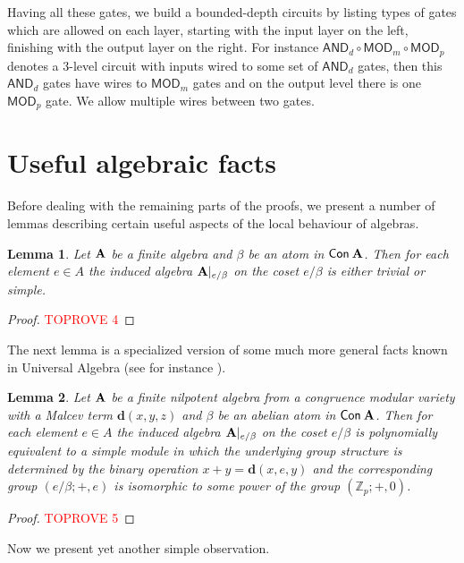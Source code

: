 \documentclass[11pt,a4paper]{amsart}
\newtheorem{lm}{Lemma}[section]
\newcommand{\m}[1]{{\uppercase {\bf{#1}}}}
\newcommand{\con}[1]{{\sf Con\:\m{#1}}}
\newcommand{\po}[1]{{\mathbf {#1}}}
\newcounter{note}
\newcommand{\z}{\mathbb{Z}}
\newcommand{\zero}{e}
\newcommand{\ccand}{\mathsf{AND}}
\newcommand{\ccmod}{\mathsf{MOD}}
\begin{document}
Having all these gates, we build a bounded-depth circuits by listing types of gates which are allowed on each layer, starting with the input layer on the left, finishing with the output layer on the right. For instance $\ccand_d\circ\ccmod_m\circ\ccmod_p$ denotes a $3$-level circuit with inputs wired to some set of $\ccand_d$ gates, then this  $\ccand_d$ gates have wires to $\ccmod_m$ gates and on the output level there is one $\ccmod_p$ gate. We allow multiple wires between two gates.

\section{Useful algebraic facts}
\label{section:collection}

Before dealing with the remaining parts of the proofs, we present a number of lemmas describing certain useful aspects of the local behaviour of algebras. 


\begin{lm}
\label{lm:simple-atom}
Let $\m A$ be a finite algebra and $\beta$ be an atom in $\con A$.
Then for each element $\zero\in A$ the induced algebra $\m A|_{\zero/\beta}$
on the coset $\zero/\beta$
is either trivial or simple.
\end{lm}
\begin{proof}\textcolor{red}{TOPROVE 4}\end{proof}


The next lemma is a specialized version of some much more general facts known in Universal Algebra (see for instance \cite[Corollary 5.8]{fm}).


\begin{lm}
\label{lm:simple-module-atom}
Let $\m A$ be a finite nilpotent algebra from a congruence modular variety
with a Malcev term $\po d(x,y,z)$
and $\beta$ be an abelian atom in $\con A$.
Then for each element $\zero\in A$ the induced algebra $\m A|_{\zero/\beta}$ on the coset $\zero/\beta$ is polynomially equivalent to a simple module in which the underlying group structure is determined by the binary operation $x+y=\po d(x,\zero,y)$
and the corresponding group $(\zero/\beta; +,\zero)$
is isomorphic to some power of the group $(\z_p;+,0)$.
\end{lm}



\begin{proof}\textcolor{red}{TOPROVE 5}\end{proof}

Now we present yet another simple observation.
\end{document}
